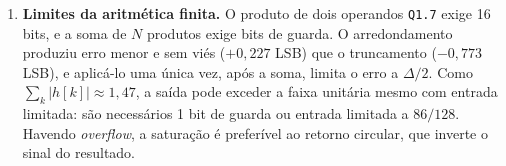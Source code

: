 \documentclass[11pt,a4paper]{article}
\newcommand{\MetricaEKMax}{86}
\begin{document}
\begin{enumerate}[label=\textbf{(\roman*)}, leftmargin=2.2em, itemsep=5pt]
    \item \textbf{Limites da aritmética finita.} O produto de dois operandos \texttt{Q1.7} exige 16 bits, e a soma de $N$ produtos exige bits de guarda. O arredondamento produziu erro menor e sem viés ($+0,227$ LSB) que o truncamento ($-0,773$ LSB), e aplicá-lo uma única vez, após a soma, limita o erro a $\Delta/2$. Como $\sum_k|h[k]| \approx 1,47$, a saída pode exceder a faixa unitária mesmo com entrada limitada: são necessários 1 bit de guarda ou entrada limitada a $\MetricaEKMax/128$. Havendo \textit{overflow}, a saturação é preferível ao retorno circular, que inverte o sinal do resultado.
\end{enumerate}

\clearpage
\begingroup
\small
\end{document}
